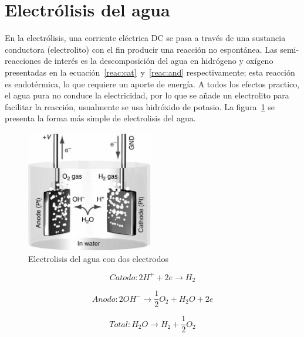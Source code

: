 \documentclass[12pt,twoside,onecolumn]{article}
\begin{document}
\section{Electrólisis del agua}
En la electrólisis, una corriente eléctrica DC se pasa a través de una sustancia conductora  (electrolito) con el fin producir una reacción no espontánea. Las semi-reacciones de interés es la descomposición del agua en hidrógeno y oxígeno~ presentadas en la ecuación~\eqref{reac:cat}~y~\eqref{reac:and} respectivamente; esta reacción es endotérmica, lo que requiere un aporte de energía. A todos los efectos practico, el agua pura no conduce la electricidad, por lo que se añade un electrolito para facilitar la reacción, usualmente se usa hidróxido de potasio. La figura~\ref{fig:electrolisis} se presenta la forma más simple de electrolisis del agua.

\begin{figure}
  \centering
   \includegraphics[width=0.5\textwidth]{figures/electrolisis}
  \caption{Electrolisis del agua con dos electrodos}
  \label{fig:electrolisis}
\end{figure}

\begin{equation} \label{reac:cat}
 Catodo: 2H^+ + 2e \rightarrow H_2
\end{equation}

\begin{equation} \label{reac:and}
 Anodo: 2OH^- \rightarrow \frac{1}{2} O_2 + H_2O + 2e
\end{equation}

\begin{equation}
 Total: H_2O \rightarrow H_2 +\frac{1}{2}O_2
 \end{equation}
\end{document}
